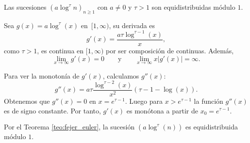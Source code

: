 \begin{example}
    Las sucesiones $(a\log^\tau n)_{n\geq1}$ con $a \neq 0$ y $\tau > 1$ son equidistribuidas módulo $1$.
\end{example}

\begin{resolve}
    Sea $g(x) = a\log^\tau (x)$ en~$[1,\infty)$, su derivada es
    \[
        g'(x) = \frac{a \tau \log^{\tau-1}(x)}{x},
    \]
    como $\tau > 1$, es continua en $[1,\infty)$ por ser composición de continuas. Además, 
    \[
        \lim_{x \to \infty} g'(x) = 0
        \qquad \text{y} \qquad
        \lim_{x \to \infty} x |g'(x)| = \infty.
    \]

    Para ver la monotonía de $g'(x)$, calculamos $g''(x)$:
    \[
        g''(x) = a \tau \frac{\log^{\tau-2}(x)}{x^2} \left(\tau - 1 - \log(x)\right).
    \]
    Obtenemos que $g''(x)=0$ en $x = e^{\tau - 1}$. Luego para $x > e^{\tau - 1}$ la función
    $g''(x)$ es de signo constante. Por tanto, $g'(x)$ es monótona a partir de $x_0 = e^{\tau - 1}$.

    Por el Teorema \ref{teo:fejer_euler}, la sucesión $(a\log^\tau (n))$ es equidistribuida módulo $1$.
\end{resolve}